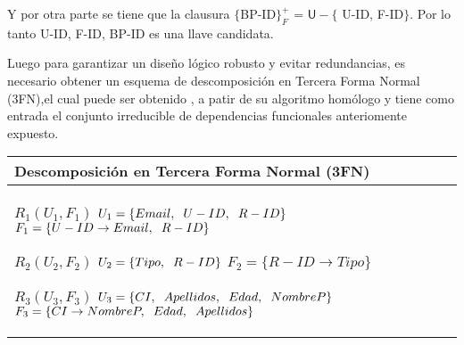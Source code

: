 \documentclass{report}
\begin{document}
    Y por otra parte se tiene que la clausura $\{$BP-ID$\}_{F}^{+}$ = $\mathsf{U} - \{$ U-ID, F-ID$\}$. Por lo 
    tanto U-ID, F-ID, BP-ID es una llave candidata. \newline

    Luego para garantizar un diseño lógico robusto y evitar redundancias, es necesario obtener un esquema de 
    descomposición en Tercera Forma Normal (3FN),el cual puede ser obtenido , a patir de su algoritmo homólogo y 
    tiene como entrada el conjunto irreducible de dependencias funcionales anteriomente expuesto. \newline
      
    \begin{tabularx}{\textwidth}{|X|}
        \toprule
        \hfil \textbf{Descomposición en Tercera Forma Normal (3FN)} \\
        \midrule

        $ R_{1} ( U_{1} , F_{1} ) $ \newline 
        $ U_{1} = \{{Email, \hspace{0.2cm}  U-ID, \hspace{0.2cm}  R-ID}\} $ \newline 
        $ F_{1} = \{U-ID \rightarrow Email, \hspace{0.2cm} R-ID \} $\newline 
        
        $ R_{2} ( U_{2} , F_{2} ) $ \newline 
        $ U_{2} = \{{Tipo, \hspace{0.2cm}  R-ID}\} $ \newline 
        $ F_{2} = \{R-ID \rightarrow Tipo \} $\newline 
        
        $ R_{3} ( U_{3} , F_{3} ) $ \newline 
        $ U_{3} = \{{CI, \hspace{0.2cm}  Apellidos, \hspace{0.2cm}  Edad, \hspace{0.2cm}  NombreP}\} $ \newline 
        $ F_{3} = \{CI \rightarrow NombreP, \hspace{0.2cm} Edad, \hspace{0.2cm} Apellidos \} $\newline 
        

\end{tabularx}
\end{document}
